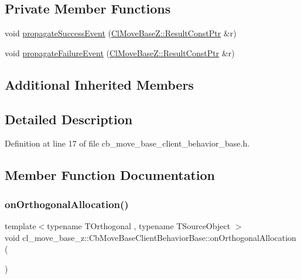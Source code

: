 \subsection*{Private Member Functions}
\begin{DoxyCompactItemize}
\item 
void \hyperlink{classcl__move__base__z_1_1CbMoveBaseClientBehaviorBase_a12109fd9132a93140e4f022ee052e2ed}{propagate\+Success\+Event} (\hyperlink{classcl__move__base__z_1_1ClMoveBaseZ_a99373d0c15ae96684462d8677f5fd632}{Cl\+Move\+Base\+Z\+::\+Result\+Const\+Ptr} \&r)
\item 
void \hyperlink{classcl__move__base__z_1_1CbMoveBaseClientBehaviorBase_a8a1d14d98893dc21c4cb2b28c35e9b09}{propagate\+Failure\+Event} (\hyperlink{classcl__move__base__z_1_1ClMoveBaseZ_a99373d0c15ae96684462d8677f5fd632}{Cl\+Move\+Base\+Z\+::\+Result\+Const\+Ptr} \&r)
\end{DoxyCompactItemize}
\subsection*{Additional Inherited Members}


\subsection{Detailed Description}


Definition at line 17 of file cb\+\_\+move\+\_\+base\+\_\+client\+\_\+behavior\+\_\+base.\+h.



\subsection{Member Function Documentation}
\mbox{\label{classcl__move__base__z_1_1CbMoveBaseClientBehaviorBase_ae9e4d5856a88c367edd755cdd00b377f}} 
\subsubsection{\texorpdfstring{on\+Orthogonal\+Allocation()}{onOrthogonalAllocation()}}
{\footnotesize\ttfamily template$<$typename T\+Orthogonal , typename T\+Source\+Object $>$ \\
void cl\+\_\+move\+\_\+base\+\_\+z\+::\+Cb\+Move\+Base\+Client\+Behavior\+Base\+::on\+Orthogonal\+Allocation (\begin{DoxyParamCaption}{ }\end{DoxyParamCaption})\hspace{0.3cm}{\ttfamily [inline]}}



